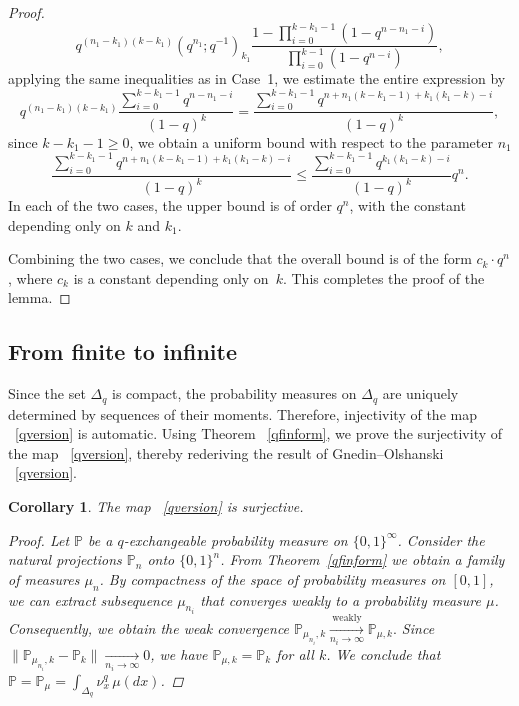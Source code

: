 \documentclass[12pt, a4paper]{amsart}
\numberwithin{equation}{subsection}
\newtheorem{corollary}[equation]{Corollary}
\theoremstyle{definition}
\newcommand{\bP}{{\mathbb P}}
\begin{document}
\begin{proof}
\begin{equation}
q^{(n_{1}-k_{1})(k-k_{1})}\left(q^{n_{1}}; q^{-1}\right)_{k_{1}} \dfrac{1 - \prod_{i=0}^{k-k_{1}-1}\left(1 - q^{n - n_{1} - i}\right)}{\prod_{i=0}^{k-1}\left(1 - q^{n - i}\right)},
\end{equation}  
applying the same inequalities as in Case~1, we estimate the entire expression by  
\begin{equation}
q^{(n_1 - k_1)(k - k_1)}  
\frac{\sum_{i=0}^{k - k_1 - 1} q^{n - n_1 - i}}{(1 - q)^k} = \dfrac{\sum_{i=0}^{k-k_{1}-1} q^{n + n_{1}(k-k_{1}-1) + k_{1}(k_{1} -k) - i}}{(1-q)^{k}},
\end{equation}  
since \( k - k_1 - 1 \geqslant 0 \), we obtain a uniform bound with respect to the parameter \(n_{1}\)  
\begin{equation}
\dfrac{\sum_{i=0}^{k-k_{1}-1} q^{n + n_{1}(k-k_{1}-1) + k_{1}(k_{1} -k) - i}}{(1-q)^{k}} \leqslant \dfrac{\sum_{i=0}^{k-k_{1}-1} q^{k_{1}(k_{1} -k) - i}}{(1-q)^{k}} q^{n}.
\end{equation}
In each of the two cases, the upper bound is of order \( q^n \), with the constant depending only on \( k \) and \( k_1 \).

Combining the two cases, we conclude that the overall bound is of the form $c_k \cdot q^n$, where $c_k$ is a constant depending only on~$k$. This completes the proof of the lemma.

\end{proof}


\subsection{From finite to infinite}Since the set $\Delta_{q}$ is compact, the probability measures on  $\Delta_{q}$ are uniquely determined by sequences of their moments. Therefore, injectivity of the map ~\eqref{qversion} is automatic. Using Theorem ~\eqref{qfinform}, we prove the surjectivity of the map ~\eqref{qversion}, thereby rederiving the result of Gnedin--Olshanski ~\eqref{qversion}.
\begin{corollary}
The map ~\eqref{qversion} is surjective.
\begin{proof}
Let $\mathbb{P}$ be a $q$-exchangeable probability measure on $\{0,1\}^{\infty}$. 
Consider the natural projections $\mathbb{P}_n$ onto $\{0,1\}^n$. 
From Theorem~\eqref{qfinform} we obtain a family of measures $\mu_n$. 
By compactness of the space of probability measures on $[0,1]$, we can extract subsequence $\mu_{n_i}$ that converges weakly to a probability measure $\mu$. Consequently, we obtain the weak convergence $\mathbb{P}_{\mu_{n_i},k} \xrightarrow[n_i \to \infty]{\text{weakly}} \mathbb{P}_{\mu,k}.$
Since
$
\|\mathbb{P}_{\mu_{n_i},k} - \mathbb{P}_k\| \xrightarrow[n_i \to \infty]{} 0$, we have \(\bP_{\mu,k} = \bP_{k}\)  for all $k$.
 We conclude that $\mathbb{P} = \mathbb{P}_{\mu} = \displaystyle
 \int_{\Delta_{q}}\nu^{q}_{x} \,\mu(dx)$.

\end{proof}
\end{corollary}
\end{document}
